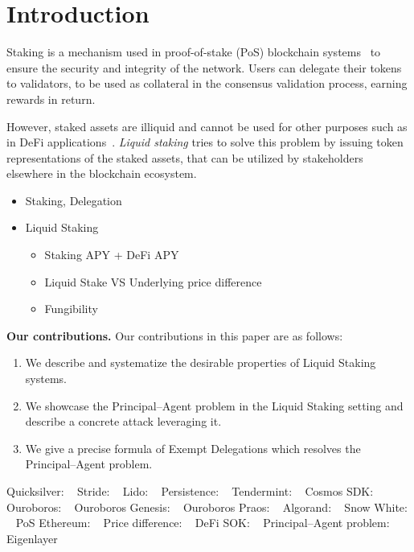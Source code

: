 \section{Introduction}

Staking is a mechanism used in proof-of-stake (PoS) blockchain
systems~\cite{2018tendermint, buchman2016tendermint,
ouroboros, algorand, casper} to ensure the security and
integrity of the network.
Users can delegate their tokens to validators, to be used as
collateral in the consensus validation process, earning rewards
in return.

However, staked assets are illiquid and cannot be used for
other purposes such as in DeFi applications~\cite{defi-sok}.
\emph{Liquid staking} tries to solve this problem by issuing
token representations of the staked assets, that can be utilized
by stakeholders elsewhere in the blockchain ecosystem.

\begin{itemize}
    \item Staking, Delegation
    \item Liquid Staking
        \begin{itemize}
            \item Staking APY + DeFi APY
            \item Liquid Stake VS Underlying price difference 
            \item Fungibility
        \end{itemize}
\end{itemize}

\noindent
\textbf{Our contributions.} Our contributions in this paper are as follows:
\begin{enumerate}
    \item We describe and systematize the desirable properties of Liquid Staking systems.
    \item We showcase the Principal--Agent problem in the Liquid Staking setting and describe a concrete attack leveraging it.
    \item We give a precise formula of Exempt Delegations which resolves the Principal--Agent problem.
\end{enumerate}

Quicksilver: ~\cite{quicksilver}
Stride: ~\cite{stride}
Lido: ~\cite{lido}
Persistence: ~\cite{persistence}
Tendermint: ~\cite{2018tendermint, buchman2016tendermint}
Cosmos SDK: ~\cite{cosmossdk}
Ouroboros: ~\cite{ouroboros}
Ouroboros Genesis: ~\cite{ouroboros-genesis}
Ouroboros Praos: ~\cite{praos}
Algorand: ~\cite{algorand}
Snow White: ~\cite{DBLP:journals/iacr/BentovPS16a}
PoS Ethereum: ~\cite{casper,buterin2020combining,sompolinsky2015secure,kiayias2017trees}
Price difference: ~\cite{scharnowski2022liquid}
DeFi SOK: ~\cite{defi-sok}
Principal--Agent problem: ~\cite{jensen1976,wealthofnations}
Eigenlayer~\cite{eigenlayer}